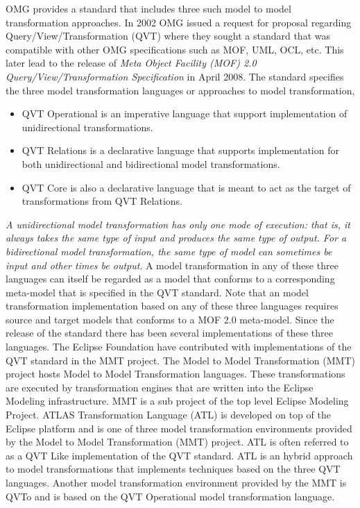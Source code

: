 OMG provides a standard that includes three such model to model transformation
approaches. In 2002 OMG issued a request for proposal regarding
Query/View/Transformation (QVT)\cite{QVT} where they sought a standard that was
compatible with other OMG specifications such as MOF, UML, OCL, etc. This later
lead to the release of \textit{Meta Object Facility (MOF) 2.0
Query/View/Transformation Specification} in April 2008. The standard specifies
the three model transformation languages or approaches to model transformation, 
\begin{itemize}
  \item QVT Operational is an imperative language that support implementation of
  unidirectional transformations.
  \item QVT Relations is a declarative language that supports implementation for
  both unidirectional and bidirectional model transformations.
  \item QVT Core is also a declarative language that is meant to act as the
  target of transformations from QVT Relations.
\end{itemize}
\textit{A unidirectional model transformation has only one mode of execution:
that is, it always takes the same type of input and produces the same type of
output. For a bidirectional model transformation, the same type of model can
sometimes be input and other times be output}\cite{WikiMT}. A model
transformation in any of these three languages can itself be regarded as a
model that conforms to a corresponding meta-model that is specified in the QVT
standard. Note that an model transformation implementation based on any of
these three languages requires source and target models that conforms to a MOF
2.0 meta-model. Since the release of the standard there has been several
implementations of these three languages. The Eclipse Foundation have
contributed with implementations of the QVT standard in the MMT project. The
Model to Model Transformation (MMT) project hosts Model to Model Transformation
languages. These transformations are executed by transformation engines that
are written into the Eclipse Modeling infrastructure. MMT is a sub project of
the top level Eclipse Modeling Project\cite{EMP}. ATLAS Transformation Language
(ATL)\cite{Jouault2008} is developed on top of the Eclipse platform and is one
of three model transformation environments provided by the Model to Model
Transformation (MMT) project\cite{MMT}. ATL is often referred to as a QVT Like
implementation of the QVT standard. ATL is an hybrid approach to model
transformations that implements techniques based on the three QVT languages.
Another model transformation environment provided by the MMT is
QVTo\cite{dvorak2008model} and is based on the QVT Operational model
transformation language.

